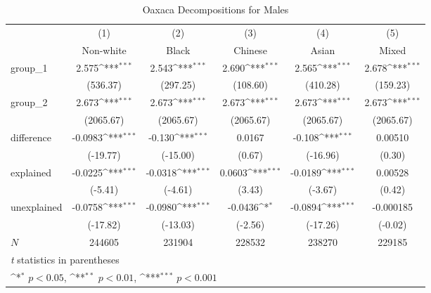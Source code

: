 \begin{table}[htbp]\centering
\def\sym#1{\ifmmode^{#1}\else\(^{#1}\)\fi}
\caption{Oaxaca Decompositions for Males\label{tab1}}
\begin{tabular}{l*{5}{c}}
\hline\hline
            &\multicolumn{1}{c}{(1)}&\multicolumn{1}{c}{(2)}&\multicolumn{1}{c}{(3)}&\multicolumn{1}{c}{(4)}&\multicolumn{1}{c}{(5)}\\
            &\multicolumn{1}{c}{Non-white}&\multicolumn{1}{c}{Black}&\multicolumn{1}{c}{Chinese}&\multicolumn{1}{c}{Asian}&\multicolumn{1}{c}{Mixed}\\
\hline
group\_1     &       2.575\sym{***}&       2.543\sym{***}&       2.690\sym{***}&       2.565\sym{***}&       2.678\sym{***}\\
            &    (536.37)         &    (297.25)         &    (108.60)         &    (410.28)         &    (159.23)         \\
group\_2     &       2.673\sym{***}&       2.673\sym{***}&       2.673\sym{***}&       2.673\sym{***}&       2.673\sym{***}\\
            &   (2065.67)         &   (2065.67)         &   (2065.67)         &   (2065.67)         &   (2065.67)         \\
difference  &     -0.0983\sym{***}&      -0.130\sym{***}&      0.0167         &      -0.108\sym{***}&     0.00510         \\
            &    (-19.77)         &    (-15.00)         &      (0.67)         &    (-16.96)         &      (0.30)         \\
explained   &     -0.0225\sym{***}&     -0.0318\sym{***}&      0.0603\sym{***}&     -0.0189\sym{***}&     0.00528         \\
            &     (-5.41)         &     (-4.61)         &      (3.43)         &     (-3.67)         &      (0.42)         \\
unexplained &     -0.0758\sym{***}&     -0.0980\sym{***}&     -0.0436\sym{*}  &     -0.0894\sym{***}&   -0.000185         \\
            &    (-17.82)         &    (-13.03)         &     (-2.56)         &    (-17.26)         &     (-0.02)         \\
\hline
\(N\)       &      244605         &      231904         &      228532         &      238270         &      229185         \\
\hline\hline
\multicolumn{6}{l}{\footnotesize \textit{t} statistics in parentheses}\\
\multicolumn{6}{l}{\footnotesize \sym{*} \(p<0.05\), \sym{**} \(p<0.01\), \sym{***} \(p<0.001\)}\\
\end{tabular}
\label{tab:oaxaca_male_summary}
\end{table}
